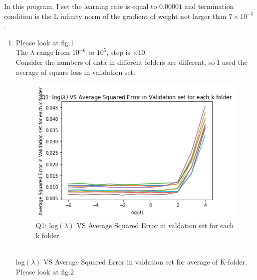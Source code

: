 \documentclass{article}
\begin{document}

In this program, I set the learning rate is equal to $0.00001$ and termination condition is the L infinity norm of the gradient of weight not larger than $7\times 10^{-5}$.
\begin{enumerate}[(1)]
\item
Please look at fig.1\\ 
The $\lambda$ range from $10^{-6}$ to $10^{5}$, step is $\times 10$.\\
Consider the numbers of data in different folders are different, so I used the average of square loss in validation set.\\
\begin{figure}
\centering
        \includegraphics[totalheight=8cm]{q_1.png}
    \caption{Q1: log$(\lambda)$ VS Average Squared Error in valdation set for each k folder}
    \label{fig:verticalcell}
\end{figure}
\\log$(\lambda)$ VS Average Squared Error in valdation set for average of K-folder. Please look at fig.2

\end{enumerate}
\end{document}
